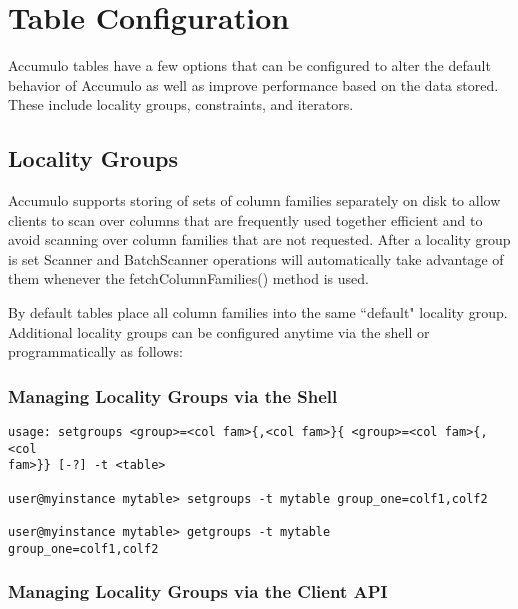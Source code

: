 \chapter{Table Configuration}

Accumulo tables have a few options that can be configured to alter the default
behavior of Accumulo as well as improve performance based on the data stored.
These include locality groups, constraints, and iterators.

\section{Locality Groups}
Accumulo supports storing of sets of column families separately on disk to allow
clients to scan over columns that are frequently used together efficient and to avoid
scanning over column families that are not requested. After a locality group is set
Scanner and BatchScanner operations will automatically take advantage of them
whenever the fetchColumnFamilies() method is used.

By default tables place all column families into the same ``default" locality group.
Additional locality groups can be configured anytime via the shell or
programmatically as follows:

\subsection{Managing Locality Groups via the Shell}

\small
\begin{verbatim}
usage: setgroups <group>=<col fam>{,<col fam>}{ <group>=<col fam>{,<col
fam>}} [-?] -t <table>

user@myinstance mytable> setgroups -t mytable group_one=colf1,colf2

user@myinstance mytable> getgroups -t mytable
group_one=colf1,colf2
\end{verbatim}
\normalsize

\subsection{Managing Locality Groups via the Client API}

